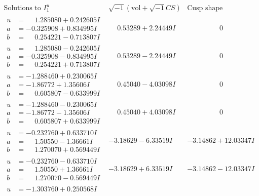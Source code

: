 \documentclass[1p]{elsarticle_modified}
\theoremstyle{definition}
\newcommand{\I}{\sqrt{-1}}
\begin{document}
$$\begin{array}{c|c|c}
\text{Solutions to }I^u_{1}& \I (\text{vol} + \sqrt{-1}CS) & \text{Cusp shape}\\
 \hline 
\begin{aligned}
u &= \phantom{-}1.285080 + 0.242605 I \\
a &= -0.325908 + 0.834995 I \\
b &= \phantom{-}0.254221 - 0.713807 I\end{aligned}
 & \phantom{-}0.53289 + 2.24449 I & \phantom{-0.000000 } 0 \\ \hline\begin{aligned}
u &= \phantom{-}1.285080 - 0.242605 I \\
a &= -0.325908 - 0.834995 I \\
b &= \phantom{-}0.254221 + 0.713807 I\end{aligned}
 & \phantom{-}0.53289 - 2.24449 I & \phantom{-0.000000 } 0 \\ \hline\begin{aligned}
u &= -1.288460 + 0.230065 I \\
a &= -1.86772 + 1.35606 I \\
b &= \phantom{-}0.605807 - 0.633999 I\end{aligned}
 & \phantom{-}0.45040 - 4.03098 I & \phantom{-0.000000 } 0 \\ \hline\begin{aligned}
u &= -1.288460 - 0.230065 I \\
a &= -1.86772 - 1.35606 I \\
b &= \phantom{-}0.605807 + 0.633999 I\end{aligned}
 & \phantom{-}0.45040 + 4.03098 I & \phantom{-0.000000 } 0 \\ \hline\begin{aligned}
u &= -0.232760 + 0.633710 I \\
a &= \phantom{-}1.50550 - 1.36661 I \\
b &= \phantom{-}1.270070 + 0.569449 I\end{aligned}
 & -3.18629 - 6.33519 I & -3.14862 + 12.03347 I \\ \hline\begin{aligned}
u &= -0.232760 - 0.633710 I \\
a &= \phantom{-}1.50550 + 1.36661 I \\
b &= \phantom{-}1.270070 - 0.569449 I\end{aligned}
 & -3.18629 + 6.33519 I & -3.14862 - 12.03347 I \\ \hline\begin{aligned}
u &= -1.303760 + 0.250568 I \\

\end{aligned}
\end{array}$$
\end{document}
